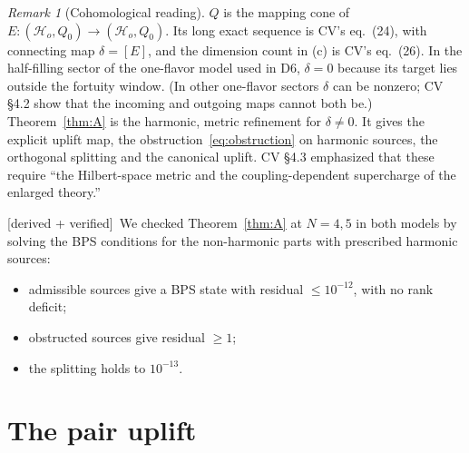 \documentclass[11pt]{article}
\newcommand{\Hc}{\mathcal H}
\newcommand{\tagbox}[2]{\textsf{\small\color{#1}[#2]}}
\newcommand{\VER}{\tagbox{cder}{derived + verified}}
\theoremstyle{plain}
\theoremstyle{remark}
\newtheorem*{remark}{Remark}
\numberwithin{equation}{section}
\begin{document}
\begin{remark}[Cohomological reading]
$Q$ is the mapping cone of $E:(\Hc_o,Q_0)\to(\Hc_o,Q_0)$. Its long exact sequence is CV's eq.~(24), with connecting map
$\delta=[E]$, and the dimension count in (c) is CV's eq.~(26). In the half-filling sector of the one-flavor model
used in D6, $\delta=0$ because its target lies outside the fortuity window. (In other one-flavor sectors $\delta$ can be
nonzero; CV \S4.2 show that the incoming and outgoing maps cannot both be.) Theorem~\ref{thm:A} is the harmonic, metric
refinement for $\delta\neq0$.
It gives the explicit uplift map, the obstruction~\eqref{eq:obstruction} on harmonic sources, the orthogonal splitting
and the canonical uplift. CV \S4.3 emphasized that these require ``the Hilbert-space metric and the coupling-dependent
supercharge of the enlarged theory.''
\end{remark}

\VER\ We checked Theorem~\ref{thm:A} at $N=4,5$ in both models by solving the BPS conditions for the non-harmonic parts
with prescribed harmonic sources:
\begin{itemize}\itemsep2pt
\item admissible sources give a BPS state with residual $\le10^{-12}$, with no rank deficit;
\item obstructed sources give residual $\ge1$;
\item the splitting holds to $10^{-13}$.
\end{itemize}

\section{The pair uplift}\label{sec:pair}
\end{document}

